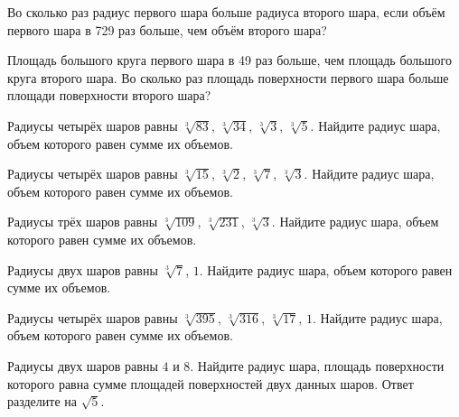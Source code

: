 \documentclass[a4paper]{article}
\begin{document}
\begin{taskBN}{65}
Во сколько раз радиус первого шара больше радиуса второго шара, если объём первого шара в 729 раз больше, чем объём второго шара?
\end{taskBN}

\begin{taskBN}{66}
Площадь большого круга первого шара в 49 раз больше, чем площадь большого круга второго шара. Во сколько раз площадь поверхности первого шара больше площади поверхности второго шара?
\end{taskBN}

\begin{taskBN}{67}
Радиусы четырёх шаров равны $\sqrt[3]{83}$, $\sqrt[3]{34}$, $\sqrt[3]{3}$, $\sqrt[3]{5}$. Найдите радиус шара, объем которого равен сумме их объемов.
\end{taskBN}

\begin{taskBN}{68}
Радиусы четырёх шаров равны $\sqrt[3]{15}$, $\sqrt[3]{2}$, $\sqrt[3]{7}$, $\sqrt[3]{3}$. Найдите радиус шара, объем которого равен сумме их объемов.
\end{taskBN}

\begin{taskBN}{69}
Радиусы трёх шаров равны $\sqrt[3]{109}$, $\sqrt[3]{231}$, $\sqrt[3]{3}$. Найдите радиус шара, объем которого равен сумме их объемов.
\end{taskBN}

\begin{taskBN}{70}
Радиусы двух шаров равны $\sqrt[3]{7}$, $1$. Найдите радиус шара, объем которого равен сумме их объемов.
\end{taskBN}

\begin{taskBN}{71}
Радиусы четырёх шаров равны $\sqrt[3]{395}$, $\sqrt[3]{316}$, $\sqrt[3]{17}$, $1$. Найдите радиус шара, объем которого равен сумме их объемов.
\end{taskBN}

\begin{taskBN}{72}
Радиусы двух шаров равны $4$ и $8$. Найдите радиус шара, площадь поверхности которого равна сумме площадей поверхностей двух данных шаров. Ответ разделите на $\sqrt{5}$.
\end{taskBN}
\end{document}
